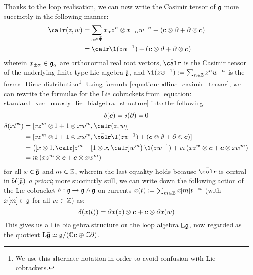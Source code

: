         Thanks to the loop realisation, we can now write the Casimir tensor of $\mathfrak{g}$ more succinctly in the following manner:
            \begin{equation} \label{equation: affine_casimir_tensor}
                \begin{aligned}
                    \calr(z, w) & = \sum_{\alpha \in \bar{\rootsystem}} x_{\alpha} z^n \tensor x_{-\alpha} w^{-n} + ( \level \tensor \del + \del \tensor \level )
                    \\
                    & = \bar{\calr} \1(zw^{-1}) + ( \level \tensor \del + \del \tensor \level )
                \end{aligned}
            \end{equation}
        wherein $x_{\pm \alpha} \in \mathfrak{g}_{\alpha}$ are orthonormal real root vectors, $\bar{\calr}$ is the Casimir tensor of the underlying finite-type Lie algebra $\bar{\mathfrak{g}}$, and $\1(zw^{-1}) := \sum_{n \in \Z} z^n w^{-n}$ is the formal Dirac distribution\footnote{We use this alternate notation in order to avoid confusion with Lie cobrackets.}. Using formula \eqref{equation: affine_casimir_tensor}, we can rewrite the formulae for the Lie cobrackets from \eqref{equation: standard_kac_moody_lie_bialgebra_structure} into the following:
            \begin{equation}
                \begin{gathered}
                    \delta(\level) = \delta(\del) = 0
                    \\
                    \begin{aligned}
                        \delta( x t^m ) & = [x z^m \tensor 1 + 1 \tensor x w^m, \calr(z, w)]
                        \\
                        & = [ x z^m \tensor 1 + 1 \tensor x w^m, \bar{\calr} \1(zw^{-1}) + ( \level \tensor \del + \del \tensor \level ) ]
                        \\
                        & = \left( [x \tensor 1, \bar{\calr}] z^m + [1 \tensor x, \bar{\calr}] w^m \right) \1(zw^{-1}) + m \left( x z^m \tensor \level + \level \tensor x w^m \right)
                        \\
                        & = m \left( x z^m \tensor \level + \level \tensor x w^m \right)
                    \end{aligned}
                \end{gathered}  
            \end{equation}
        for all $x \in \bar{\mathfrak{g}}$ and $m \in \mathbb{Z}$, wherein the last equality holds because $\bar{\calr}$ is central in $\mathcal{U}(\bar{\mathfrak{g}})$ \textit{a priori}; more succinctly still, we can write down the following action of the Lie cobracket $\delta: \mathfrak{g} \to \mathfrak{g} \wedge \mathfrak{g}$ on currents $x(t) := \sum_{m \in \mathbb{Z}} x[m] t^{-m}$ (with $x[m] \in \bar{\mathfrak{g}}$ for all $m \in \mathbb{Z}$) as:
            $$\delta( x(t) ) = \del x(z) \tensor \level + \level \tensor \del x(w)$$
        This gives us a Lie bialgebra structure on the loop algebra $\mathrm{L} \bar{\mathfrak{g}}$, now regarded as the quotient $\mathrm{L} \bar{\mathfrak{g}} \simeq \mathfrak{g}/(\mathbb{C} \boldsymbol{c} \oplus \mathbb{C} \partial)$. 